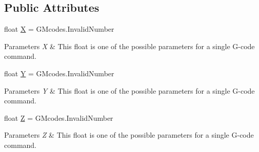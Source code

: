 \subsection*{Public Attributes}
\begin{DoxyCompactItemize}
\item 
\mbox{\label{class_gcode_command_a5b7b9c6bd1f4e1f1ecbace62f323ca72}} 
float \hyperlink{class_gcode_command_a5b7b9c6bd1f4e1f1ecbace62f323ca72}{X} = G\+Mcodes.\+Invalid\+Number
\begin{DoxyCompactList}\small\item\em 
\begin{DoxyParams}{Parameters}
{\em X} & This float is one of the possible parameters for a single G-\/code command.\\
\hline
\end{DoxyParams}
\end{DoxyCompactList}\item 
\mbox{\label{class_gcode_command_a27525d0b7ae679a68bee5900fb76b591}} 
float \hyperlink{class_gcode_command_a27525d0b7ae679a68bee5900fb76b591}{Y} = G\+Mcodes.\+Invalid\+Number
\begin{DoxyCompactList}\small\item\em 
\begin{DoxyParams}{Parameters}
{\em Y} & This float is one of the possible parameters for a single G-\/code command.\\
\hline
\end{DoxyParams}
\end{DoxyCompactList}\item 
\mbox{\label{class_gcode_command_aa6f11f780ad151a1c233b65873369fd6}} 
float \hyperlink{class_gcode_command_aa6f11f780ad151a1c233b65873369fd6}{Z} = G\+Mcodes.\+Invalid\+Number
\begin{DoxyCompactList}\small\item\em 
\begin{DoxyParams}{Parameters}
{\em Z} & This float is one of the possible parameters for a single G-\/code command.\\
\hline
\end{DoxyParams}
\end{DoxyCompactList}\item 
\mbox{\label{class_gcode_command_ad853d24d1bd2f9a240db21073aa70485}} 

\end{DoxyCompactItemize}
